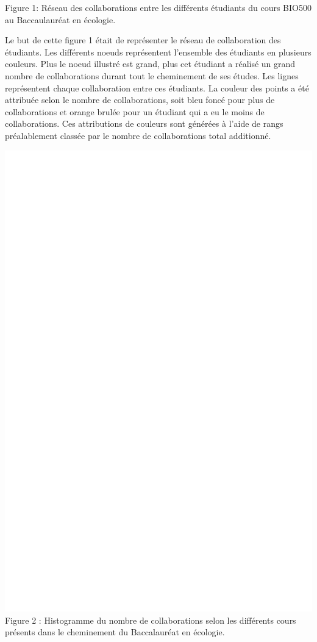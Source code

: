 \documentclass[
]{article}
\begin{document}
Figure 1: Réseau des collaborations entre les différents étudiants du
cours BIO500 au Baccaulauréat en écologie.

Le but de cette figure 1 était de représenter le réseau de collaboration
des étudiants. Les différents noeuds représentent l'ensemble des
étudiants en plusieurs couleurs. Plus le noeud illustré est grand, plus
cet étudiant a réalisé un grand nombre de collaborations durant tout le
cheminement de ses études. Les lignes représentent chaque collaboration
entre ces étudiants. La couleur des points a été attribuée selon le
nombre de collaborations, soit bleu foncé pour plus de collaborations et
orange brulée pour un étudiant qui a eu le moins de collaborations. Ces
attributions de couleurs sont générées à l'aide de rangs préalablement
classée par le nombre de collaborations total additionné.

\hfill\break
\includegraphics{images/Histogramme_de_collaboration_par_cours.png}Figure
2 : Histogramme du nombre de collaborations selon les différents cours
présents dans le cheminement du Baccalauréat en écologie.
\end{document}
